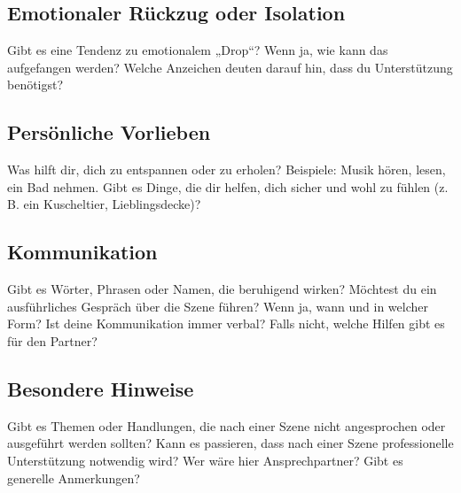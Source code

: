 \documentclass[a4paper,12pt]{article}
\begin{document}
\subsection{Emotionaler Rückzug oder Isolation}
\noindent Gibt es eine Tendenz zu emotionalem „Drop“? Wenn ja, wie kann das aufgefangen werden? Welche Anzeichen deuten darauf hin, dass du Unterstützung benötigst? \newline
\noindent \TextField[name=AftercareDrop,multiline=true,height=7em, width=37em]{}

\subsection{Persönliche Vorlieben}
\noindent Was hilft dir, dich zu entspannen oder zu erholen? Beispiele: Musik hören, lesen, ein Bad nehmen. Gibt es Dinge, die dir helfen, dich sicher und wohl zu fühlen (z. B. ein Kuscheltier, Lieblingsdecke)? \newline
\noindent \TextField[name=AftercarePreference,multiline=true,height=7em, width=37em]{}

\subsection{Kommunikation}
\noindent Gibt es Wörter, Phrasen oder Namen, die beruhigend wirken? Möchtest du ein ausführliches Gespräch über die Szene führen? Wenn ja, wann und in welcher Form? Ist deine Kommunikation immer verbal? Falls nicht, welche Hilfen gibt es für den Partner?\newline
\noindent \TextField[name=AftercareKommunikation,multiline=true,height=7em, width=37em]{}

\subsection{Besondere Hinweise}
\noindent Gibt es Themen oder Handlungen, die nach einer Szene nicht angesprochen oder ausgeführt werden sollten? Kann es passieren, dass nach einer Szene professionelle Unterstützung notwendig wird? Wer wäre hier Ansprechpartner? Gibt es generelle Anmerkungen?\newline
\noindent \TextField[name=AftercareBesonders,multiline=true,height=7em, width=37em]{}
\end{document}
